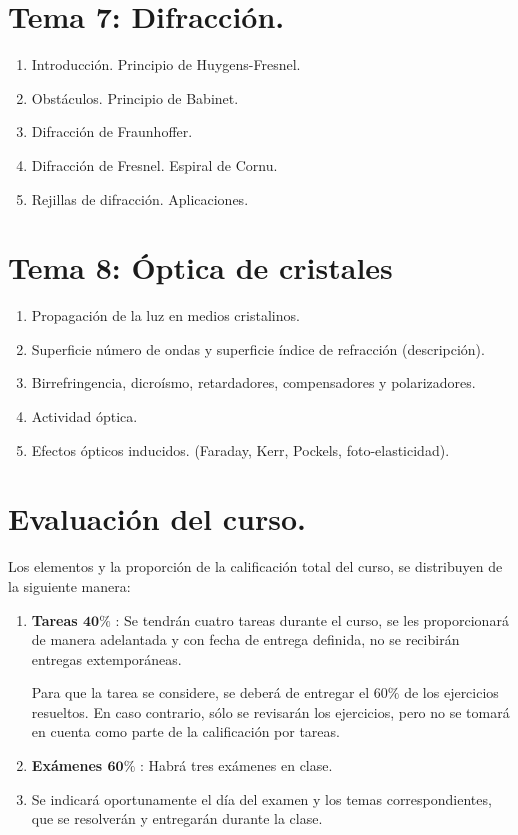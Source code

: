 \section{Tema 7: Difracción.}
\begin{enumerate}
\item Introducción. Principio de Huygens-Fresnel.
\item Obstáculos. Principio de Babinet.
\item Difracción de Fraunhoffer.
\item Difracción de Fresnel. Espiral de Cornu.
\item Rejillas de difracción. Aplicaciones.
\end{enumerate}

\section{Tema 8: Óptica de cristales}
\begin{enumerate}
\item Propagación de la luz en medios cristalinos.
\item Superficie número de ondas y superficie índice de refracción (descripción).
\item Birrefringencia, dicroísmo, retardadores, compensadores y polarizadores.
\item Actividad óptica.
\item Efectos ópticos inducidos. (Faraday, Kerr, Pockels, foto-elasticidad).
\end{enumerate}

\section{Evaluación del curso.}

Los elementos y la proporción de la calificación total del curso, se distribuyen de la siguiente manera:

\begin{enumerate}
\item \textbf{Tareas $\mathbf{40\%}$} : Se tendrán cuatro tareas durante el curso, se les proporcionará de manera adelantada y con fecha de entrega definida, no se recibirán entregas extemporáneas.

Para que la tarea se considere, se deberá de entregar el $60\%$ de los ejercicios resueltos. En caso contrario, sólo se revisarán los ejercicios, pero no se tomará en cuenta como parte de la calificación por tareas.
\item \textbf{Exámenes $\mathbf{60\%}$} : Habrá tres exámenes en clase. 
\item Se indicará oportunamente el día del examen y los temas correspondientes, que se resolverán y entregarán durante la clase.
\end{enumerate}

